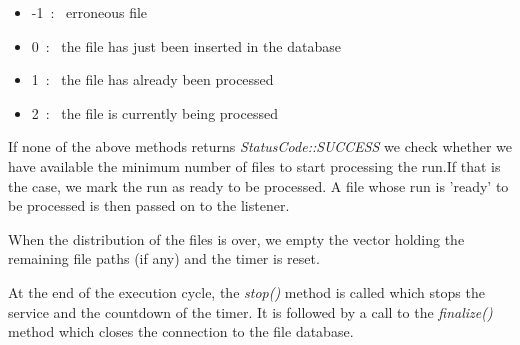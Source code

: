 \begin{itemize}
\item -1~:~ erroneous file\par
\item 0~:~ the file has just been inserted in the database\par
\item 1~:~ the file has already been processed\par
\item 2~:~ the file is currently being processed\par
\end{itemize}
If none of the above methods returns \textit{StatusCode::SUCCESS} we check whether we have available the minimum number of files to start processing the run.If that is the case, we mark the run as ready to be processed. A file whose run is 'ready' to be processed is then passed on to the listener.\par
When the distribution of the files is over, we empty the vector holding the remaining file paths (if any) and the timer is reset.\par
At the end of the execution cycle, the \textit{stop()} method is called which stops the service and the countdown of the timer. It is followed by a call to the \textit{finalize()} method which closes the connection to the file database.\par


